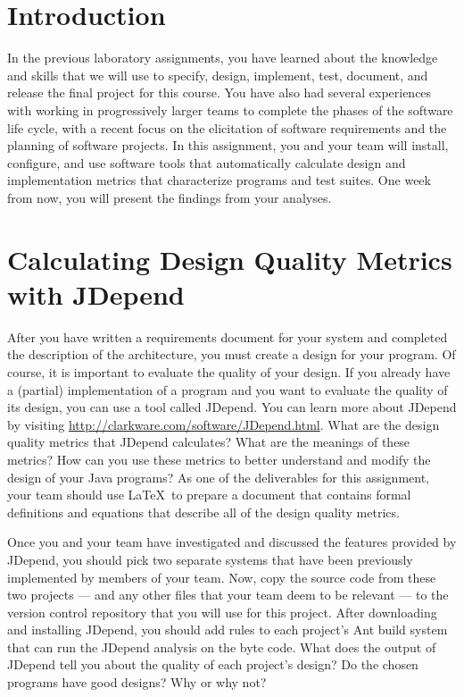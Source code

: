 

\usepackage[compact]{titlesec}



\section*{Introduction}

In the previous laboratory assignments, you have learned about the knowledge and skills that we will use to specify,
design, implement, test, document, and release the final project for this course.  You have also had several experiences
with working in progressively larger teams to complete the phases of the software life cycle, with a recent focus on the
elicitation of software requirements and the planning of software projects.  In this assignment, you and your team will
install, configure, and use software tools that automatically calculate design and implementation metrics that
characterize programs and test suites.  One week from now, you will present the findings from your analyses.

\section*{Calculating Design Quality Metrics with JDepend}

After you have written a requirements document for your system and completed the description of the architecture, you
must create a design for your program.  Of course, it is important to evaluate the quality of your design.  If you
already have a (partial) implementation of a program and you want to evaluate the quality of its design, you can use a tool
called JDepend.  You can learn more about JDepend by visiting \url{http://clarkware.com/software/JDepend.html}. What are
the design quality metrics that JDepend calculates? What are the meanings of these metrics? How can you use these
metrics to better understand and modify the design of your Java programs? As one of the deliverables for this
assignment, your team should use \LaTeX\ to prepare a document that contains formal definitions and equations that
describe all of the design quality metrics.

Once you and your team have investigated and discussed the features provided by JDepend, you should pick two separate
systems that have been previously implemented by members of your team. Now, copy the source code from these two projects
--- and any other files that your team deem to be relevant --- to the version control repository that you will use for
this project.  After downloading and installing JDepend, you should add rules to each project's Ant build system that
can run the JDepend analysis on the byte code. What does the output of JDepend tell you about the quality of each
project's design? Do the chosen programs have good designs? Why or why not?

